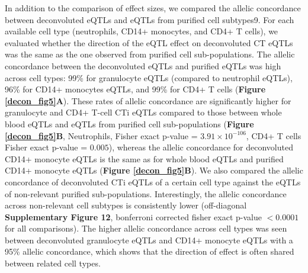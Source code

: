 In addition to the comparison of effect sizes, we compared the allelic concordance between deconvoluted eQTLs and eQTLs from purified cell subtypes9. For each available cell type (neutrophils, CD14+ monocytes, and CD4+ T cells), we evaluated whether the direction of the eQTL effect on deconvoluted CT eQTLs was the same as the one observed from purified cell sub-populations. The allelic concordance between the deconvoluted eQTLs and purified eQTLs was high across cell types: 99\% for granulocyte eQTLs (compared to neutrophil eQTLs), 96\% for CD14+ monocytes eQTLs, and 99\% for CD4+ T cells (\textbf{Figure \ref{decon_fig5}A}). These rates of allelic concordance are significantly higher for granulocyte and CD4+ T-cell CTi eQTLs compared to those between whole blood eQTLs and eQTLs from purified cell sub-populations (\textbf{Figure \ref{decon_fig5}B}, Neutrophils, Fisher exact p-value = $3.91 \times 10^{-106}$, CD4+ T cells Fisher exact p-value = $0.005$),  whereas the allelic concordance for deconvoluted CD14+ monocyte eQTLs is the same as for whole blood eQTLs and purified CD14+ monocyte eQTLs (\textbf{Figure \ref{decon_fig5}B}). We also compared the allelic concordance of deconvoluted CTi eQTLs of a certain cell type against the eQTLs of non-relevant purified sub-populations. Interestingly, the allelic concordance across non-relevant cell subtypes is consistently lower (off-diagonal \textbf{Supplementary Figure 12}, bonferroni corrected fisher exact p-value $< 0.0001$ for all comparisons). The higher allelic concordance across cell types was seen between deconvoluted granulocyte eQTLs and CD14+ monocyte eQTLs with a 95\% allelic concordance, which shows that the direction of effect is often shared between related cell types.

